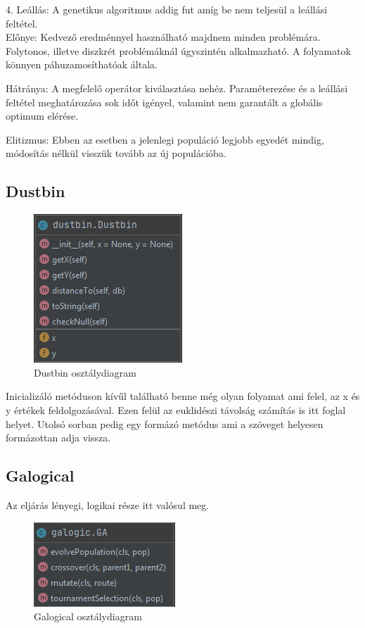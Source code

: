 4. Leállás: A genetikus algoritmus addig fut amíg be nem teljesül a leállási feltétel.\\

Előnye: Kedvező eredménnyel használható majdnem minden problémára. Folytonos, illetve diszkrét problémáknál úgyszintén alkalmazható. A folyamatok könnyen páhuzamosíthatóak általa.

Hátránya: A megfelelő operátor kiválasztása nehéz. Paraméterezése és a leállási feltétel meghatározása sok időt igényel, valamint nem garantált a globális optimum elérése.

Elitizmus: Ebben az esetben a jelenlegi populáció legjobb egyedét mindig, módosítás nélkül visszük tovább az új populációba.


\subsection{
Dustbin
}

\begin{figure}[!htb]
\centering
\includegraphics[scale=0.7]{images/dustbin.png}
\caption{Dustbin osztálydiagram}
\label{fig:dustbin}
\end{figure}

Inicializáló metóduson kívűl található benne még olyan folyamat ami felel, az x és y értékek feldolgozásával. Ezen felül az euklidészi távolság számítás is itt foglal helyet. Utolsó sorban pedig egy formázó metódus ami a szöveget helyesen formázottan adja vissza.

\subsection{
Galogical
}

Az eljárás lényegi, logikai része itt valósul meg.

\begin{figure}[!htb]
\centering
\includegraphics[scale=0.8]{images/galogic.png}
\caption{Galogical osztálydiagram}
\label{fig:galogical}
\end{figure}

